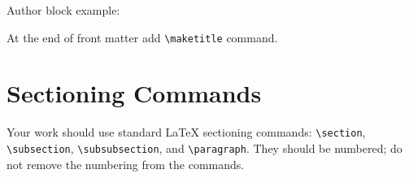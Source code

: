 \documentclass[
]{ceurart}
\begin{document}
Author block example:







At the end of front matter add \verb|\maketitle| command.

\section{Sectioning Commands}

Your work should use standard \LaTeX{} sectioning commands:
\verb|\section|, \verb|\subsection|,
\verb|\subsubsection|, and
\verb|\paragraph|. They should be numbered; do not remove
the numbering from the commands.
\end{document}
